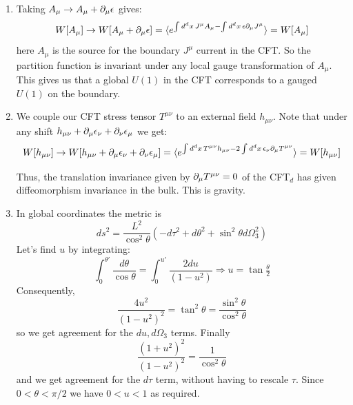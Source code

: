 \documentclass[11pt, class=article, crop=false]{standalone}
\begin{document}
\begin{enumerate}
\begin{enumerate}
	\end{enumerate}
	
	\item Taking $A_\mu \to A_\mu + \partial_\mu \epsilon$ gives:
	\[
		W[A_\mu] \to W[A_\mu + \partial_\mu \epsilon] = \braket{e^{\int d^d x\, J^\mu A_\mu - \int d^d x\, \epsilon \partial_\mu J^\mu }} = W[A_\mu]
	\]
	here $A_\mu$ is the source for the boundary $J^\mu$ current in the CFT. So the partition function is invariant under any local gauge transformation of $A_\mu$. This gives us that a global $U(1)$ in the CFT corresponds to a gauged $U(1)$ on the boundary.
	
	\item We couple our CFT stress tensor $T^{\mu \nu}$ to an external field $h_{\mu \nu}$. Note that under any shift $h_{\mu \nu} + \partial_\mu \epsilon_\nu + \partial_\nu \epsilon_\mu$ we get:
	\[
		W[h_{\mu \nu}] \to W[h_{\mu \nu} + \partial_\mu \epsilon_\nu + \partial_\nu \epsilon_\mu] = \braket{e^{\int d^d x\, T^{\mu \nu} h_{\mu \nu}- 2 \int d^d x\, \epsilon_\nu \partial_\mu T^{\mu \nu}}} = W[h_{\mu \nu}]
	\]
	
	Thus, the translation invariance given by $\partial_\mu T^{\mu \nu} = 0$ of the CFT$_d$ has given diffeomorphism invariance in the bulk. This is gravity. 
	
	\item In global coordinates the metric is
	\[
		ds^2 = \frac{L^2}{\cos^2 \theta} \left(-d\tau^2 + d \theta^2 + \sin^2 \theta d\Omega_3^2 \right)
	\]
	Let's find $u$ by integrating:
	\[
		\int_0^{\theta'} \frac{d\theta}{\cos \theta} = \int_0^{u'} \frac{2 du}{(1-u^2)} \Rightarrow u = \tan \tfrac\theta2
	\]
	Consequently,
	\[
		\frac{4 u^2}{(1-u^2)^2} = \tan^2 \theta = \frac{\sin^2 \theta}{\cos^2 \theta}
	\]
	so we get agreement for the $du, d\Omega_3$ terms. Finally
	\[
		\frac{(1+u^2)^2}{(1-u^2)^2} = \frac{1}{\cos^2 \theta}
	\]
	and we get agreement for the $d\tau$ term, without having to rescale $\tau$. Since $0 < \theta < \pi/2$ we have $0 < u < 1$ as required. 
	

\end{enumerate}
\end{document}
